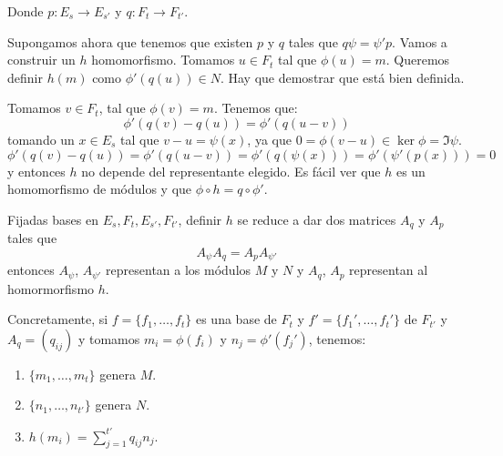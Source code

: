 Donde \(p:E_s\longrightarrow E_{s'}\)
y \(q:F_t\longrightarrow F_{t'}\).

Supongamos ahora que tenemos que existen \(p\) y \(q\)
tales que \(q\psi=\psi' p\). Vamos
a construir un \(h\) homomorfismo. Tomamos \(u\in F_t\)
tal que \(\phi(u)=m\). Queremos definir \(h(m)\) como
\(\phi'(q(u))\in N\). Hay que demostrar que está bien definida.

Tomamos \(v\in F_t\), tal que \(\phi(v)=m\). Tenemos que:
\[
  \phi'(q(v)-q(u))=\phi'(q(u-v))
\]
tomando un \(x\in E_s\) tal que \(v-u=\psi(x)\), ya que
\(0=\phi(v-u)\in\ker\phi=\Im\psi\).
\[
  \phi'(q(v)-q(u))=\phi'(q(u-v))=\phi'(q(\psi(x)))=
  \phi'(\psi'(p(x)))=0
\]
y entonces \(h\) no depende del representante elegido.
Es fácil ver que \(h\) es un homomorfismo de módulos y que
\(\phi\circ h= q\circ\phi'\).

Fijadas bases en \(E_s, F_t, E_{s'}, F_{t'}\), definir \(h\) se reduce a
dar dos matrices \(A_q\) y \(A_p\) tales que
\[
  A_\psi A_q=A_p A_{\psi'}
\]
entonces \(A_\psi\), \(A_{\psi'}\) representan a los módulos \(M\) y \(N\)
y \(A_q\), \(A_p\) representan al homormorfismo \(h\).

Concretamente, si \(f=\{f_1,\ldots, f_t\}\) es una base de \(F_t\)
y \(f'=\{f_1',\ldots, f_t'\}\) de \(F_{t'}\) y
\(A_q=(q_{ij})\) y tomamos \(m_i=\phi(f_i)\) y \(n_j=\phi'(f_j')\),
tenemos:
\begin{enumerate}
  \item \(\{m_1,\ldots, m_t\}\) genera \(M\).
  \item \(\{n_1,\ldots, n_{t'}\}\) genera \(N\).
  \item \(h(m_i)=\sum_{j=1}^{t'} q_{ij}n_j\).
\end{enumerate}

